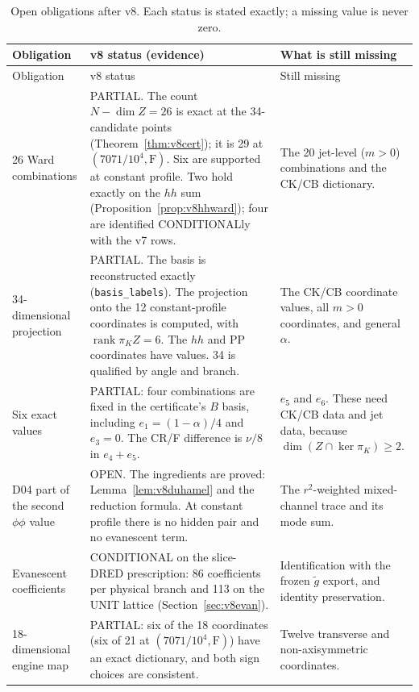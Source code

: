 \documentclass[11pt,a4paper]{article}
\newcommand{\Fr}{\mathrm F}
\newcommand{\rank}{\operatorname{rank}}
\newcommand{\loc}[1]{\nolinkurl{#1}}
\newcommand{\OPEN}{\textsf{OPEN}}
\newcommand{\CONDITIONAL}{\textsf{CONDITIONAL}}
\newcommand{\PARTIAL}{\textsf{PARTIAL}}
\theoremstyle{plain}
\theoremstyle{definition}
\theoremstyle{remark}
\numberwithin{equation}{section}
\begin{document}
\begingroup\small
\begin{longtable}{@{}L{.22\linewidth}L{.40\linewidth}L{.31\linewidth}@{}}
\caption{Open obligations after v8. Each status is stated
exactly; a missing value is never zero.}
\label{tab:open}\\
\toprule
Obligation & v8 status (evidence) & What is still missing\\
\midrule
\endfirsthead
\toprule
Obligation & v8 status & Still missing\\
\midrule
\endhead
\bottomrule
\endfoot

26 Ward combinations &
\PARTIAL. The count \(N-\dim Z=26\) is exact at the 34-candidate
points (Theorem~\ref{thm:v8cert}); it is 29 at
\((7071/10^4,\Fr)\). Six are supported at constant profile. Two
hold exactly on the \(hh\) sum
(Proposition~\ref{prop:v8hhward}); four are identified
\CONDITIONAL{}ly with the v7 rows. &
The 20 jet-level (\(m>0\)) combinations and the CK/CB dictionary.\\

34-dimensional projection &
\PARTIAL. The basis is reconstructed exactly
(\loc{basis_labels}). The projection onto the 12 constant-profile
coordinates is computed, with \(\rank\pi_KZ=6\). The \(hh\) and PP
coordinates have values. 34 is qualified by angle and branch. &
The CK/CB coordinate values, all \(m>0\) coordinates, and general
\(\alpha\).\\

Six exact values &
\PARTIAL: four combinations are fixed in the certificate's \(B\)
basis, including \(e_1=(1-\alpha)/4\) and \(e_3=0\). The CR/F
difference is \(\nu/8\) in \(e_4+e_5\). &
\(e_5\) and \(e_6\). These need CK/CB data and jet data, because
\(\dim(Z\cap\ker\pi_K)\ge2\).\\

D04 part of the second \(\phi\phi\) value &
\OPEN. The ingredients are proved: Lemma~\ref{lem:v8duhamel} and
the reduction formula. At constant profile there is no hidden pair
and no evanescent term. &
The \(r^2\)-weighted mixed-channel trace and its mode sum.\\

Evanescent coefficients &
\CONDITIONAL{} on the slice-DRED prescription: 86 coefficients per
physical branch and 113 on the UNIT lattice
(Section~\ref{sec:v8evan}). &
Identification with the frozen \(\tilde g\) export, and identity
preservation.\\

18-dimensional engine map &
\PARTIAL: six of the 18 coordinates (six of 21 at
\((7071/10^4,\Fr)\)) have an exact dictionary, and both sign
choices are consistent. &
Twelve transverse and non-axisymmetric coordinates.\\


\end{longtable}
\end{document}
